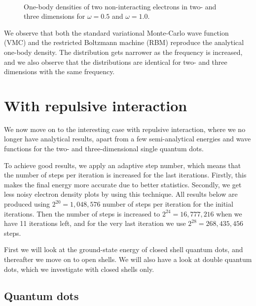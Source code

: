 \begin{figure} [h]%
	\centering
	\\
	
	\caption{One-body densities of two non-interacting electrons in two- and three dimensions for $\omega=0.5$ and $\omega=1.0$.}%
	\label{fig:OB_nointeraction}
\end{figure}

We observe that both the standard variational Monte-Carlo wave function (VMC) and the restricted Boltzmann machine (RBM) reproduce the analytical one-body density. The distribution gets narrower as the frequency is increased, and we also observe that the distributions are identical for two- and three dimensions with the same frequency.

\section{With repulsive interaction}
We now move on to the interesting case with repulsive interaction, where we no longer have analytical results, apart from a few semi-analytical energies and wave functions  for the two- and three-dimensional single quantum dots.

To achieve good results, we apply an adaptive step number, which means that the number of steps per iteration is increased for the last iterations. Firstly, this makes the final energy more accurate due to better statistics. Secondly, we get less noisy electron density plots by using this technique. All results below are produced using $2^{20}=1,048,576$ number of steps per iteration for the initial iterations. Then the number of steps is increased to $2^{24}=16,777,216$ when we have 11 iterations left, and for the very last iteration we use $2^{28}=268,435,456$ steps.

First we will look at the ground-state energy of closed shell quantum dots, and thereafter we move on to open shells. We will also have a look at double quantum dots, which we investigate with closed shells only.

\subsection{Quantum dots}
